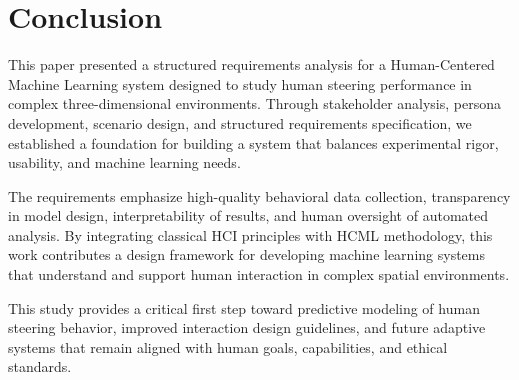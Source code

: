 \documentclass[sigconf]{acmart}
\begin{document}
\section{Conclusion}

This paper presented a structured requirements analysis for a Human-Centered Machine Learning system designed to study human steering performance in complex three-dimensional environments. Through stakeholder analysis, persona development, scenario design, and structured requirements specification, we established a foundation for building a system that balances experimental rigor, usability, and machine learning needs.

The requirements emphasize high-quality behavioral data collection, transparency in model design, interpretability of results, and human oversight of automated analysis. By integrating classical HCI principles with HCML methodology, this work contributes a design framework for developing machine learning systems that understand and support human interaction in complex spatial environments.

This study provides a critical first step toward predictive modeling of human steering behavior, improved interaction design guidelines, and future adaptive systems that remain aligned with human goals, capabilities, and ethical standards.







\end{document}
